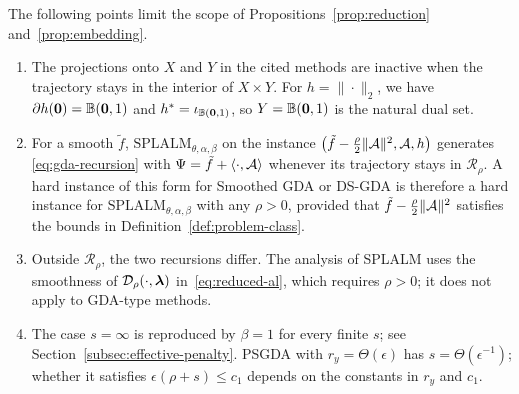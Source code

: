 \begin{remark}
\label{rem:embedding-scope}
The following points limit the scope of Propositions~\ref{prop:reduction}
and~\ref{prop:embedding}.
\begin{enumerate}[label=(\roman*)]
\item The projections onto \(X\) and \(Y\) in the cited methods are inactive
  when the trajectory stays in the interior of \(X\times Y\). For
  \(h=\|\cdot\|_2\), we have \(\partial h(\bm{0})=\mathbb B(\bm{0},1)\) and
  \(h^*=\iota_{\mathbb B(\bm{0},1)}\), so \(Y=\mathbb B(\bm{0},1)\) is the
  natural dual set.
\item For a smooth \(\tilde f\), \(\mathrm{SPLALM}_{\theta,\alpha,\beta}\) on the instance
  \(\bigl(\tilde f-\frac{\rho}{2}\|\mathcal{A}\|^2,\mathcal{A},h\bigr)\) generates
  \eqref{eq:gda-recursion} with \(\Psi=\tilde f+\langle\cdot,\mathcal{A}\rangle\)
  whenever its trajectory stays in \(\mathcal R_\rho\). A hard instance of
  this form for Smoothed GDA or DS-GDA is therefore a hard instance for
  \(\mathrm{SPLALM}_{\theta,\alpha,\beta}\) with any \(\rho>0\), provided
  that \(\tilde f-\frac{\rho}{2}\|\mathcal{A}\|^2\) satisfies the bounds in
  Definition~\ref{def:problem-class}.
\item Outside \(\mathcal R_\rho\), the two recursions differ. The analysis of
  SPLALM uses the smoothness of \(\mathcal{D}_\rho(\cdot,\bm{\lambda})\) in~\eqref{eq:reduced-al},
  which requires \(\rho>0\); it does not apply to GDA-type methods.
\item The case \(s=\infty\) is reproduced by \(\beta=1\) for every finite
  \(s\); see Section~\ref{subsec:effective-penalty}. PSGDA with
  \(r_y=\Theta(\epsilon)\) has \(s=\Theta(\epsilon^{-1})\); whether it
  satisfies \(\epsilon(\rho+s)\le c_1\) depends on the constants in \(r_y\)
  and \(c_1\).
\end{enumerate}
\end{remark}
